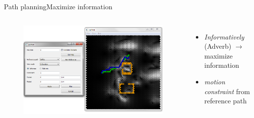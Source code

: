 \begin{frame}{Path planning}{Maximize information}

\begin{columns}
\begin{figure}
\centering
\includegraphics[width = \textwidth]{./screenshot/info_max_path.png}
\end{figure}

\begin{minipage}{\textwidth}
\begin{itemize}
\item \emph{Informatively} (Adverb) $ \rightarrow $ maximize information
\item \emph{motion constraint} from reference path
\end{itemize}
\end{minipage}
\end{columns}

\end{frame}

